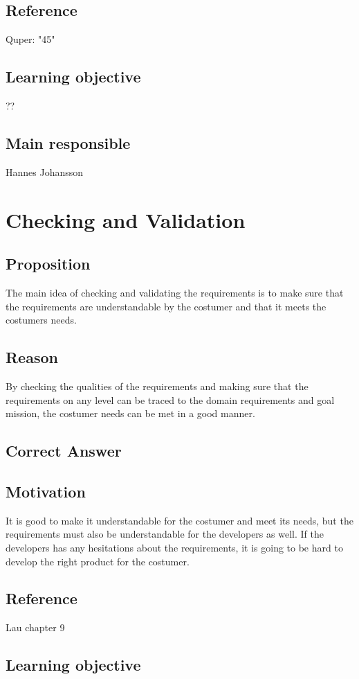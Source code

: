 \documentclass[a4paper]{article}
\begin{document}
\subsection*{Reference}
Quper: "45"
\subsection*{Learning objective}
??
\subsection*{Main responsible}
Hannes Johansson


\section{Checking and Validation}

\subsection*{Proposition}
The main idea of checking and validating the requirements is to make sure that the requirements are understandable by the costumer and that it meets the costumers needs.
\subsection*{Reason}
By checking the qualities of the requirements and making sure that the requirements on any level can be traced to the domain requirements and goal mission, the costumer needs can be met in a good manner.
\subsection*{Correct Answer}

\subsection*{Motivation}
 It is good to make it understandable for the costumer and meet its needs, but the requirements must also be understandable for the developers as well. If the developers has any hesitations about the requirements, it is going to be hard to develop the right product for the costumer.
\subsection*{Reference}
Lau chapter 9
\subsection*{Learning objective}
\end{document}
